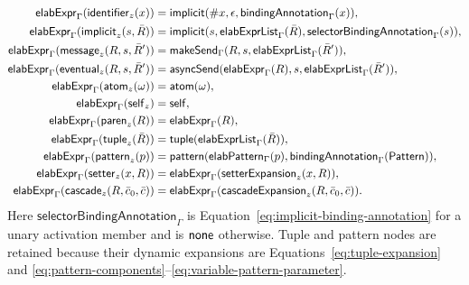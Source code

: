 \begin{equation}\label{eq:expression-elaboration}
\begin{aligned}
 \mathsf{elabExpr}_{\Gamma}(\mathsf{identifier}_{z}(x))
   &=\mathsf{implicit}(\#x,\epsilon,
      \mathsf{bindingAnnotation}_{\Gamma}(x)),\\
 \mathsf{elabExpr}_{\Gamma}(\mathsf{implicit}_{z}(s,\bar R))
   &=\mathsf{implicit}(s,\mathsf{elabExprList}_{\Gamma}(\bar R),
      \mathsf{selectorBindingAnnotation}_{\Gamma}(s)),\\
 \mathsf{elabExpr}_{\Gamma}(\mathsf{message}_{z}(R,s,\bar R'))
   &=\mathsf{makeSend}_{\Gamma}
       (R,s,\mathsf{elabExprList}_{\Gamma}(\bar R')),\\
 \mathsf{elabExpr}_{\Gamma}(\mathsf{eventual}_{z}(R,s,\bar R'))
   &=\mathsf{asyncSend}(\mathsf{elabExpr}_{\Gamma}(R),s,
                    \mathsf{elabExprList}_{\Gamma}(\bar R')),\\
 \mathsf{elabExpr}_{\Gamma}(\mathsf{atom}_{z}(\omega))&=\mathsf{atom}(\omega),\\
 \mathsf{elabExpr}_{\Gamma}(\mathsf{self}_{z})&=\mathsf{self},\\
 \mathsf{elabExpr}_{\Gamma}(\mathsf{paren}_{z}(R))&=\mathsf{elabExpr}_{\Gamma}(R),\\
 \mathsf{elabExpr}_{\Gamma}(\mathsf{tuple}_{z}(\bar R))
   &=\mathsf{tuple}(\mathsf{elabExprList}_{\Gamma}(\bar R)),\\
 \mathsf{elabExpr}_{\Gamma}(\mathsf{pattern}_{z}(p))
   &=\mathsf{pattern}(\mathsf{elabPattern}_{\Gamma}(p),
       \mathsf{bindingAnnotation}_{\Gamma}(\mathsf{Pattern})),\\
 \mathsf{elabExpr}_{\Gamma}(\mathsf{setter}_{z}(x,R))
   &=\mathsf{elabExpr}_{\Gamma}(\mathsf{setterExpansion}_{z}(x,R)),\\
 \mathsf{elabExpr}_{\Gamma}(\mathsf{cascade}_{z}(R,\bar c_0,\bar c))
   &=\mathsf{elabExpr}_{\Gamma}
      (\mathsf{cascadeExpansion}_{z}(R,\bar c_0,\bar c)).
\end{aligned}
\end{equation}
Here $\mathsf{selectorBindingAnnotation}_{\Gamma}$ is
Equation~\eqref{eq:implicit-binding-annotation} for a unary activation member
and is $\mathsf{none}$ otherwise.  Tuple and pattern nodes are retained because
their dynamic expansions are Equations~\eqref{eq:tuple-expansion} and
\eqref{eq:pattern-components}--\eqref{eq:variable-pattern-parameter}.

